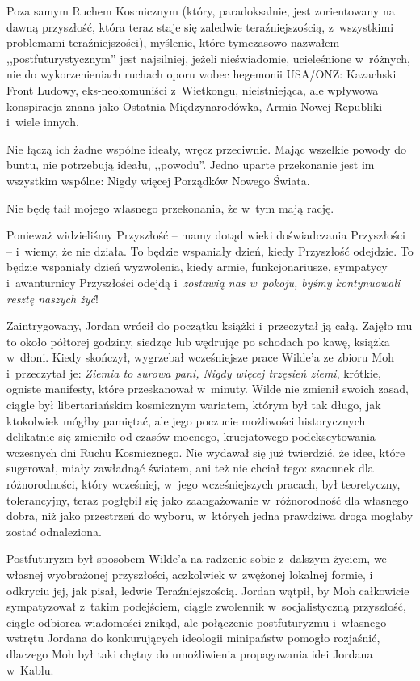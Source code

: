 \documentclass[oneside,polish,11pt,sfheadings]{mwbk}
\begin{document}
Poza samym Ruchem Kosmicznym (który, paradoksalnie, jest zorientowany na
dawną przyszłość, która teraz staje się zaledwie teraźniejszością, z~wszystkimi problemami teraźniejszości), myślenie, które tymczasowo
nazwałem ,,postfuturystycznym'' jest najsilniej, jeżeli nieświadomie,
ucieleśnione w~różnych, nie do wykorzenieniach ruchach oporu wobec
hegemonii USA/ONZ: Kazachski Front Ludowy, eks-neokomuniści z~Wietkongu,
nieistniejąca, ale wpływowa konspiracja znana jako Ostatnia
Międzynarodówka, Armia Nowej Republiki i~wiele innych.

Nie łączą ich żadne wspólne ideały, wręcz przeciwnie. Mając wszelkie
powody do buntu, nie potrzebują ideału, ,,powodu''. Jedno uparte
przekonanie jest im wszystkim wspólne: Nigdy więcej Porządków Nowego
Świata.

Nie będę taił mojego własnego przekonania, że w~tym mają rację.

Ponieważ widzieliśmy Przyszłość -- mamy dotąd wieki doświadczania
Przyszłości -- i~wiemy, że nie działa. To będzie wspaniały dzień, kiedy
Przyszłość odejdzie. To będzie wspaniały dzień wyzwolenia, kiedy armie,
funkcjonariusze, sympatycy i~awanturnicy Przyszłości odejdą i~\emph{zostawią nas w~pokoju, byśmy kontynuowali resztę naszych żyć}!

Zaintrygowany, Jordan wrócił do początku książki i~przeczytał ją całą.
Zajęło mu to około półtorej godziny, siedząc lub wędrując po schodach po
kawę, książka w~dłoni. Kiedy skończył, wygrzebał wcześniejsze prace
Wilde'a ze zbioru Moh i~przeczytał je: \emph{Ziemia to surowa pani,
Nigdy więcej trzęsień ziemi}, krótkie, ogniste manifesty, które
przeskanował w~minuty. Wilde nie zmienił swoich zasad, ciągle był
libertariańskim kosmicznym wariatem, którym był tak długo, jak
ktokolwiek mógłby pamiętać, ale jego poczucie możliwości historycznych
delikatnie się zmieniło od czasów mocnego, krucjatowego podekscytowania
wczesnych dni Ruchu Kosmicznego. Nie wydawał się już twierdzić, że idee,
które sugerował, miały zawładnąć światem, ani też nie chciał tego:
szacunek dla różnorodności, który wcześniej, w~jego wcześniejszych
pracach, był teoretyczny, tolerancyjny, teraz pogłębił się jako
zaangażowanie w~różnorodność dla własnego dobra, niż jako przestrzeń do
wyboru, w~których jedna prawdziwa droga mogłaby zostać odnaleziona.

Postfuturyzm był sposobem Wilde'a na radzenie sobie z~dalszym życiem, we
własnej wyobrażonej przyszłości, aczkolwiek w~zwężonej lokalnej formie,
i odkryciu jej, jak pisał, ledwie Teraźniejszością. Jordan wątpił, by
Moh całkowicie sympatyzował z~takim podejściem, ciągle zwolennik w~socjalistyczną przyszłość, ciągle odbiorca wiadomości znikąd, ale
połączenie postfuturyzmu i~własnego wstrętu Jordana do konkurujących
ideologii minipaństw pomogło rozjaśnić, dlaczego Moh był taki chętny do
umożliwienia propagowania idei Jordana w~Kablu.
\end{document}
